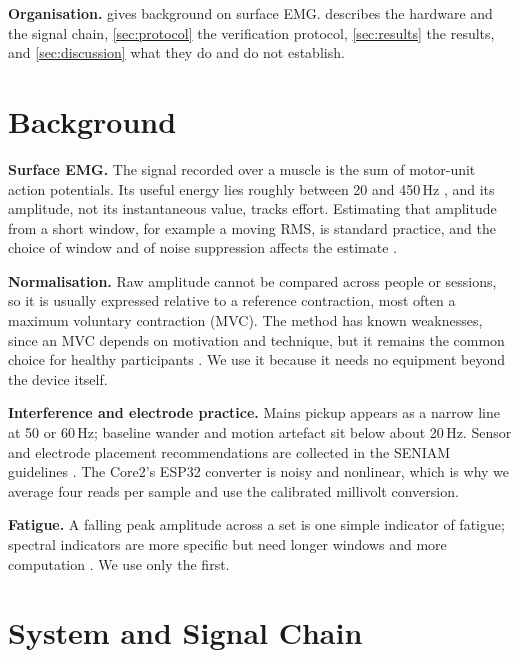 \documentclass[11pt,letterpaper]{article}
\begin{document}
\textbf{Organisation.}  gives background on surface EMG.  describes the hardware and the signal chain, \cref{sec:protocol} the verification protocol, \cref{sec:results} the results, and \cref{sec:discussion} what they do and do not establish.

\section{Background}\label{sec:background}
\textbf{Surface EMG.} The signal recorded over a muscle is the sum of motor-unit action potentials. Its useful energy lies roughly between 20 and 450\,Hz \citep{deluca1997,merletti2004}, and its amplitude, not its instantaneous value, tracks effort. Estimating that amplitude from a short window, for example a moving RMS, is standard practice, and the choice of window and of noise suppression affects the estimate \citep{clancy2002}.

\textbf{Normalisation.} Raw amplitude cannot be compared across people or sessions, so it is usually expressed relative to a reference contraction, most often a maximum voluntary contraction (MVC). The method has known weaknesses, since an MVC depends on motivation and technique, but it remains the common choice for healthy participants \citep{burden2010}. We use it because it needs no equipment beyond the device itself.

\textbf{Interference and electrode practice.} Mains pickup appears as a narrow line at 50 or 60\,Hz; baseline wander and motion artefact sit below about 20\,Hz. Sensor and electrode placement recommendations are collected in the SENIAM guidelines \citep{hermens2000}. The Core2's ESP32 converter is noisy and nonlinear, which is why we average four reads per sample and use the calibrated millivolt conversion.

\textbf{Fatigue.} A falling peak amplitude across a set is one simple indicator of fatigue; spectral indicators are more specific but need longer windows and more computation \citep{cifrek2009}. We use only the first.

\section{System and Signal Chain}\label{sec:system}
\end{document}
